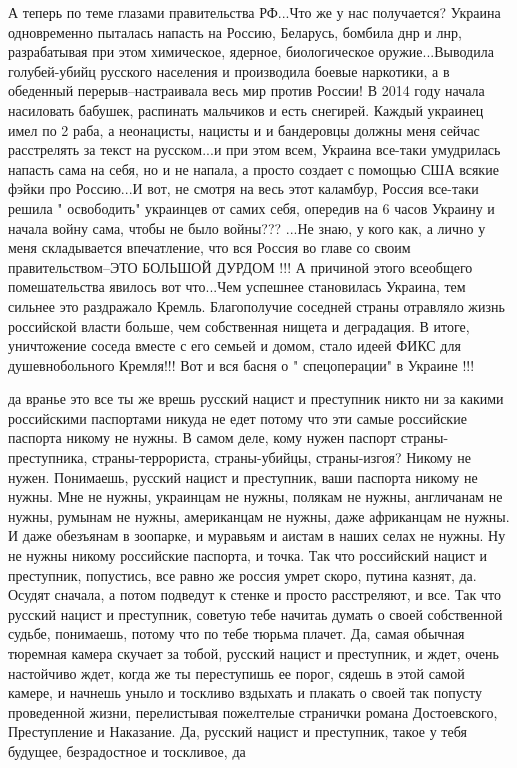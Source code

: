 А теперь по теме глазами правительства РФ...Что же у нас получается? Украина
одновременно пыталась напасть на Россию, Беларусь, бомбила днр и лнр,
разрабатывая при этом химическое, ядерное, биологическое оружие...Выводила
голубей-убийц русского населения и производила боевые наркотики, а в обеденный
перерыв--настраивала весь мир против России! В 2014 году начала насиловать
бабушек, распинать мальчиков и есть снегирей. Каждый украинец имел по 2 раба, а
неонацисты, нацисты и и бандеровцы должны меня сейчас расстрелять за текст на
русском...и при этом всем, Украина все-таки умудрилась напасть сама на себя, но
и не напала, а просто создает с помощью США всякие фэйки про Россию...И вот, не
смотря на весь этот каламбур, Россия все-таки решила " освободить" украинцев от
самих себя, опередив на 6 часов Украину и начала войну сама, чтобы не было
войны??? ...Не знаю, у кого как, а лично у меня складывается впечатление, что
вся Россия во главе со своим правительством--ЭТО БОЛЬШОЙ ДУРДОМ !!! А причиной
этого всеобщего помешательства явилось вот что...Чем успешнее становилась
Украина, тем сильнее это раздражало Кремль. Благополучие соседней страны
отравляло жизнь российской власти больше, чем собственная нищета и деградация.
В итоге, уничтожение соседа вместе с его семьей и домом, стало идеей ФИКС для
душевнобольного Кремля!!! Вот и вся басня о " спецоперации" в Украине !!!

да вранье это все ты же врешь русский нацист и преступник никто ни за какими
российскими паспортами никуда не едет потому что эти самые российские паспорта
никому не нужны. В самом деле, кому нужен паспорт страны-преступника,
страны-террориста, страны-убийцы, страны-изгоя? Никому не нужен. Понимаешь,
русский нацист и преступник, ваши паспорта никому не нужны. Мне не нужны,
украинцам не нужны, полякам не нужны, англичанам не нужны, румынам не нужны,
американцам не нужны, даже африканцам не нужны. И даже обезъянам в зоопарке, и
муравьям и аистам в наших селах не нужны. Ну не нужны никому российские
паспорта, и точка. Так что российский нацист и преступник, попустись, все равно
же россия умрет скоро, путина казнят, да. Осудят сначала, а потом подведут к
стенке и просто расстреляют, и все. Так что русский нацист и преступник,
советую тебе начитаь думать о своей собственной судьбе, понимаешь, потому что
по тебе тюрьма плачет. Да, самая обычная тюремная камера скучает за тобой,
русский нацист и преступник, и ждет, очень настойчиво ждет, когда же ты
переступишь ее порог, сядешь в этой самой камере, и начнешь уныло и тоскливо
вздыхать и плакать о своей так попусту проведенной жизни, перелистывая
пожелтелые странички романа Достоевского, Преступление и Наказание. Да, русский
нацист и преступник, такое у тебя будущее, безрадостное и тоскливое, да

